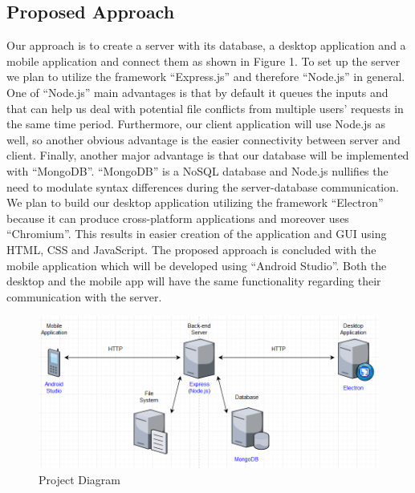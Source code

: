 \documentclass[11pt]{article}
\begin{document}
	\subsection{Proposed Approach}
	Our approach is to create a server with its database, a desktop application and a mobile application and connect them as shown in Figure 1. 
To set up the server we plan to utilize the framework “Express.js” and therefore “Node.js” in general. One of “Node.js” main advantages is that by default it queues the inputs and that can help us deal with potential file conflicts from multiple users’ requests in the same time period. Furthermore, our client application will use Node.js as well, so another obvious advantage is the easier connectivity between server and client. Finally, another major advantage is that our database will be implemented with “MongoDB”. “MongoDB” is a NoSQL database and Node.js nullifies the need to modulate syntax differences during the server-database communication. We plan to build our desktop application utilizing the framework “Electron” because it can produce cross-platform applications and moreover uses “Chromium”. This results in easier creation of the application and GUI using HTML, CSS and JavaScript. The proposed approach is concluded with the mobile application which will be developed using “Android Studio”. Both the desktop and the mobile app will have the same functionality regarding their communication with the server.
\begin{figure}[h]
\centering
\includegraphics[scale=0.65]{ProjectDiagram.png}
\caption{Project Diagram}
\end{figure}
\end{document}
